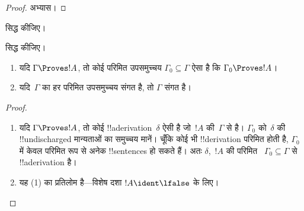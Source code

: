 \documentclass[../../../include/open-logic-section]{subfiles}
\begin{document}
\begin{proof}
अभ्यास।
\end{proof}

\begin{prob}
 सिद्ध कीजिए।
\end{prob}
\tagendprob

\begin{prob}
 सिद्ध कीजिए।
\end{prob}
\tagendprob

\begin{prop}[संहतता]
  \begin{enumerate}
  \item यदि $\Gamma \Proves !A$, तो कोई परिमित उपसमुच्चय $\Gamma_0
    \subseteq \Gamma$ ऐसा है कि $\Gamma_0 \Proves !A$।
  \item यदि~$\Gamma$ का हर परिमित उपसमुच्चय संगत है, तो $\Gamma$ संगत है।
  \end{enumerate}
\end{prop}

\begin{proof}
  \begin{enumerate}
    \item यदि $\Gamma \Proves !A$, तो कोई !!a{derivation}~$\delta$ ऐसी है
      जो~$!A$ की~$\Gamma$ से है। $\Gamma_0$ को~$\delta$ की
      !!{undischarged} मान्यताओं का समुच्चय मानें। चूँकि कोई भी
      !!{derivation} परिमित होती है, $\Gamma_0$ में केवल परिमित रूप से अनेक
      !!{sentence}s हो सकते हैं। अतः $\delta$,~$!A$ की परिमित
      ~$\Gamma_0 \subseteq \Gamma$ से !!a{derivation} है।
    \item यह (1) का प्रतिलोम है—विशेष दशा $!A
      \ident \lfalse$ के लिए।
  \end{enumerate}
\end{proof}
\end{document}
